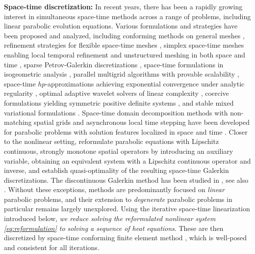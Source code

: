 \documentclass[review,11pt]{article}
\numberwithin{equation}{section}
\begin{document}
\textbf{Space-time discretization:} In recent years, there has been a rapidly growing interest in simultaneous space-time methods across a range of problems, including 
linear parabolic evolution equations. Various formulations and strategies have been proposed and analyzed, including conforming methods on general meshes \cite{steinbach2015space}, refinement strategies for flexible space-time meshes \cite{neumuller2011refinement}, simplex space-time meshes enabling local temporal refinement and unstructured meshing in both space and time 
\cite{Simplex_sp}, sparse Petrov-Galerkin discretizations \cite{Andreev2013}, space-time formulations in isogeometric analysis \cite{LANGER2016342, AntoniettiDede2025}, parallel multigrid algorithms with provable scalability \cite{GanderNeumuller2016}, space-time $hp$-approximations achieving exponential convergence under analytic regularity \cite{devaud2018space}, optimal adaptive wavelet solvers of linear complexity \cite{rekatsinas2019optimal}, coercive formulations yielding symmetric positive definite systems \cite{SteinbachZank2020}, and stable mixed variational formulations \cite{StevensonWesterdiep2021}. Space-time domain decomposition methods with non-matching spatial grids and asynchronous local time stepping have been developed for parabolic problems with solution features localized in space and time \cite{jayadharan:hal-03355088}. Closer to the nonlinear setting, \cite{beranek2025quasioptimal} reformulate parabolic equations with Lipschitz continuous, strongly monotone spatial operators by introducing an auxiliary variable, obtaining an equivalent system with a Lipschitz continuous operator and inverse, and establish quasi-optimality of the resulting space-time Galerkin discretizations. The discontinuous Galerkin method has been studied in \cite{Jan2012}, see also \cite{congreve2026residual,dolejvsi2024error,DOLEJSI2019276,DolejsiRoskovec2021}. Without these exceptions, methods are predominantly focused on \emph{linear} parabolic problems, and their extension to \emph{degenerate} parabolic problems in particular remains largely unexplored. Using the iterative space-time linearization introduced below, \emph{we reduce solving the reformulated nonlinear system \eqref{eq:reformulation} to solving a sequence of heat equations}. These are then discretized by space-time conforming finite element method \cite{steinbach2015space}, which is well-posed and consistent for all iterations.
\end{document}
